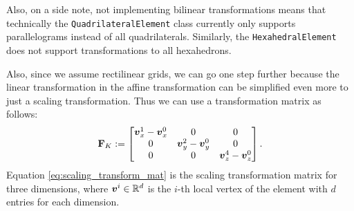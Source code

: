 Also, on a side note, not implementing bilinear transformations means that technically the \texttt{QuadrilateralElement} class currently only supports
parallelograms instead of all quadrilaterals.
Similarly, the \texttt{HexahedralElement} does not support transformations to all hexahedrons.

Also, since we assume rectilinear grids, we can go one step further because the linear transformation in the affine transformation
can be simplified even more to just a scaling transformation.
Thus we can use a transformation matrix as follows:
\begin{align}
    \label{eq:scaling_transform_mat}
    \mathbf{F}_K := \begin{bmatrix}
                     \boldsymbol{v}^1_x - \boldsymbol{v}^0_x & 0                                       & 0                                       \\
                     0                                       & \boldsymbol{v}^2_y - \boldsymbol{v}^0_y & 0                                       \\
                     0                                       & 0                                       & \boldsymbol{v}^4_z - \boldsymbol{v}^0_z
                 \end{bmatrix}.
\end{align}
Equation \ref{eq:scaling_transform_mat} is the scaling transformation matrix for three dimensions,
where $\boldsymbol{v}^i \in \mathbb{R}^d$ is the $i$-th local vertex of the element with $d$ entries for each dimension.

